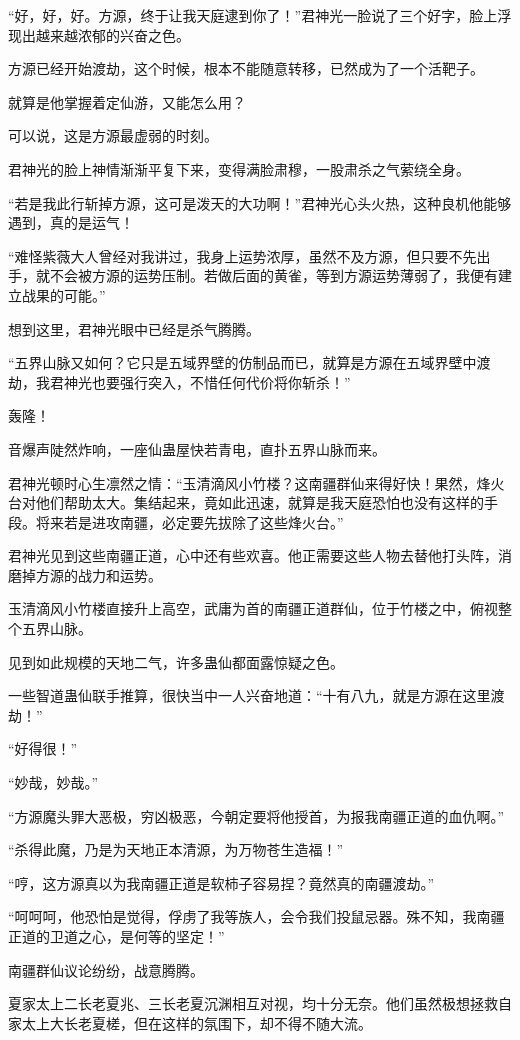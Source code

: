 \begin{this_body}
“好，好，好。方源，终于让我天庭逮到你了！”君神光一脸说了三个好字，脸上浮现出越来越浓郁的兴奋之色。

方源已经开始渡劫，这个时候，根本不能随意转移，已然成为了一个活靶子。

就算是他掌握着定仙游，又能怎么用？

可以说，这是方源最虚弱的时刻。

君神光的脸上神情渐渐平复下来，变得满脸肃穆，一股肃杀之气萦绕全身。

“若是我此行斩掉方源，这可是泼天的大功啊！”君神光心头火热，这种良机他能够遇到，真的是运气！

“难怪紫薇大人曾经对我讲过，我身上运势浓厚，虽然不及方源，但只要不先出手，就不会被方源的运势压制。若做后面的黄雀，等到方源运势薄弱了，我便有建立战果的可能。”

想到这里，君神光眼中已经是杀气腾腾。

“五界山脉又如何？它只是五域界壁的仿制品而已，就算是方源在五域界壁中渡劫，我君神光也要强行突入，不惜任何代价将你斩杀！”

轰隆！

音爆声陡然炸响，一座仙蛊屋快若青电，直扑五界山脉而来。

君神光顿时心生凛然之情：“玉清滴风小竹楼？这南疆群仙来得好快！果然，烽火台对他们帮助太大。集结起来，竟如此迅速，就算是我天庭恐怕也没有这样的手段。将来若是进攻南疆，必定要先拔除了这些烽火台。”

君神光见到这些南疆正道，心中还有些欢喜。他正需要这些人物去替他打头阵，消磨掉方源的战力和运势。

玉清滴风小竹楼直接升上高空，武庸为首的南疆正道群仙，位于竹楼之中，俯视整个五界山脉。

见到如此规模的天地二气，许多蛊仙都面露惊疑之色。

一些智道蛊仙联手推算，很快当中一人兴奋地道：“十有八九，就是方源在这里渡劫！”

“好得很！”

“妙哉，妙哉。”

“方源魔头罪大恶极，穷凶极恶，今朝定要将他授首，为报我南疆正道的血仇啊。”

“杀得此魔，乃是为天地正本清源，为万物苍生造福！”

“哼，这方源真以为我南疆正道是软柿子容易捏？竟然真的南疆渡劫。”

“呵呵呵，他恐怕是觉得，俘虏了我等族人，会令我们投鼠忌器。殊不知，我南疆正道的卫道之心，是何等的坚定！”

南疆群仙议论纷纷，战意腾腾。

夏家太上二长老夏兆、三长老夏沉渊相互对视，均十分无奈。他们虽然极想拯救自家太上大长老夏槎，但在这样的氛围下，却不得不随大流。


\end{this_body}
